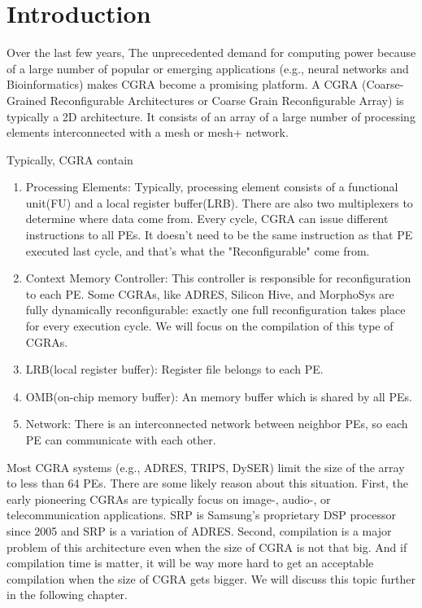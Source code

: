 \chapter{Introduction}

Over the last few years, The unprecedented demand for computing power because of a large number of popular or emerging applications (e.g., neural networks and Bioinformatics) makes CGRA become a promising platform. A CGRA (Coarse-Grained Reconﬁgurable Architectures or Coarse Grain Reconfigurable Array) is typically a 2D architecture. It consists of an array of a large number of processing elements interconnected with a mesh or mesh+ network. 

Typically, CGRA contain 
\begin{enumerate} 
    \item Processing Elements:
    Typically, processing element consists of a functional unit(FU) and a local register buffer(LRB). There are also two multiplexers to determine where data come from. Every cycle, CGRA can issue different instructions to all PEs. It doesn't need to be the same instruction as that PE executed last cycle, and that's what the "Reconﬁgurable" come from.
    \item Context Memory Controller:
     This controller is responsible for reconﬁguration to each PE. Some CGRAs, like ADRES, Silicon Hive, and MorphoSys are fully dynamically reconﬁgurable: exactly one full reconﬁguration takes place for every execution cycle\cite{ARC}. We will focus on the compilation of this type of CGRAs. 
     \item LRB(local register buffer): Register file belongs to each PE.
     \item OMB(on-chip memory buffer): An memory buffer which is shared by all PEs.
     \item Network: There is an interconnected network between neighbor PEs, so each PE can communicate with each other.
\end{enumerate}

Most CGRA systems (e.g., ADRES\cite{ADRES}, TRIPS\cite{TRIPS}, DySER)\cite[]{DySER} limit the size of the array to less than 64 PEs. There are some likely reason about this situation. First, the early pioneering CGRAs are typically focus on image-, audio-, or telecommunication applications\cite{SURVEY}. SRP is Samsung’s proprietary DSP processor since 2005\cite{SRP} and SRP is a variation of ADRES. Second, compilation is a major problem of this architecture even when the size of CGRA is not that big. And if compilation time is matter, it will be way more hard to get an acceptable compilation when the size of CGRA gets bigger. We will discuss this topic further in the following chapter.

